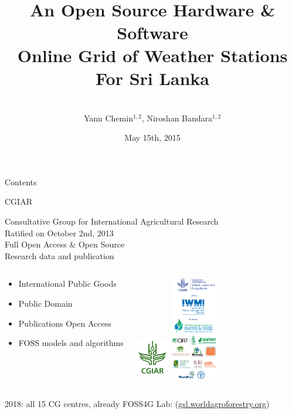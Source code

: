\documentclass[xcolor=dvipsnames,beamer,unknownkeysallowed]{beamer} %
\title[IWMI - OSHW]
{\ \\
\ \\
An Open Source Hardware \& Software\\
Online Grid of Weather Stations\\
For Sri Lanka}
\author[Chemin, Bandara]
{\vspace{30pt}\\
Yann Chemin$^{1,2}$, Niroshan Bandara$^{1,2}$}
\institute[IWMI - U of Moratuwa]
{$^1$International Water Management Institute\\
 \vspace{5pt}
 $^2$University of Moratuwa - Town and Country Planning Department\\
\begin{center}
\end{center}
}
\date{\tiny May 15th, 2015}
\begin{document}
\begin{frame}
 \maketitle
\end{frame}

\begin{frame}{Contents}
 \begin{multicols}{2}
  \setcounter{tocdepth}{2}  
  \tableofcontents
 \end{multicols} 
\end{frame}

\begin{frame}[fragile]{CGIAR}

Consultative Group for International Agricultural Research\\
Ratified on October 2nd, 2013\\
Full Open Access \& Open Source\\
Research data and publication

\begin{columns}
\begin{center}
\begin{itemize}
 \item International Public Goods
 \item Public Domain
 \item Publications Open Access
 \item FOSS models and algorithms
\end{itemize}
\end{center}

\begin{center}
  \includegraphics[width=1.5cm]{CGIAR_Green}
  \hspace{5mm}
  \includegraphics[width=2cm]{WLE_and_partners-vertical_logo_strip.png}
\end{center}
\end{columns}
\vspace{5mm} 2018: all 15 CG centres, already FOSS4G Lab:
(\href{http://gsl.worldagroforestry.org}{gsl.worldagroforestry.org})
\end{frame}
\end{document}
